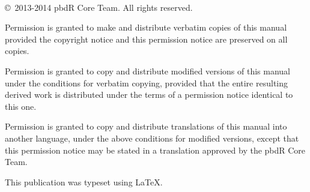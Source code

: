 \documentclass[a4paper,11pt]{article}
\begin{document}
\date{}
\maketitle

\ \vfill

\copyright\ 2013-2014 pbdR Core Team.  All rights reserved.

Permission is granted to make and distribute verbatim copies of this manual provided the copyright notice and this permission notice are preserved on all copies.

Permission is granted to copy and distribute modified versions of this manual under the conditions for verbatim copying, provided that the entire resulting derived work is distributed under the terms of a permission notice identical to this one.

Permission is granted to copy and distribute translations of this manual into another language, under the above conditions for modified versions, except that this permission notice may be stated in a translation approved by the pbdR Core Team. 

This publication was typeset using \LaTeX.  


\newpage
{}
\fancyhf[R]{\thepage }
\fancyfoot{}
\tableofcontents


\newpage
{}
\setcounter{page}{1}
\pagestyle{fancy}

\bodyheadfoot








\end{document}
